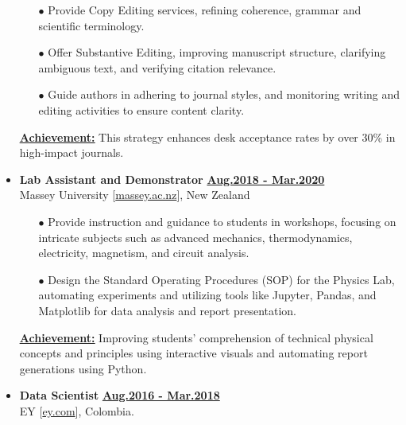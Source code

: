 \begin{itemize}[leftmargin=5mm]
          \begin{itemize}[leftmargin=0mm]
              \small

              \item[$\bullet$] Provide Copy Editing services, refining coherence, grammar and scientific terminology.
              \item[$\bullet$] Offer Substantive Editing, improving manuscript structure, clarifying ambiguous text, and verifying citation relevance.
              \item[$\bullet$] Guide authors in adhering to journal styles, and monitoring writing and editing activities to ensure content clarity.
          \end{itemize}

          \textbf{\href{.}{\underline{Achievement:}}}
          This strategy enhances desk acceptance rates by over 30\% in high-impact journals.


    \item \textbf{\large Lab Assistant and Demonstrator}\hfill
          \href{.}{\bf Aug.2018 - Mar.2020}\\
          Massey University [\href{www.massey.ac.nz}{massey.ac.nz}],
          New Zealand

          \begin{itemize}[leftmargin=0mm]
              \small

              \item[$\bullet$] Provide instruction and guidance to students in workshops, focusing on intricate subjects such as advanced mechanics, thermodynamics, electricity, magnetism, and circuit analysis.
              \item[$\bullet$] Design the Standard Operating Procedures (SOP) for the Physics Lab, automating experiments and utilizing tools like Jupyter, Pandas, and Matplotlib for data analysis and report presentation.
          \end{itemize}

          \textbf{\href{.}{\underline{Achievement:}}}
          Improving students' comprehension of technical physical concepts and principles using interactive visuals and automating report generations using Python.

    \item \textbf{\large Data Scientist}\hfill
          \href{.}{\bf Aug.2016 - Mar.2018}\\
          EY [\href{www.ey.com}{ey.com}],
          Colombia.


\end{itemize}
